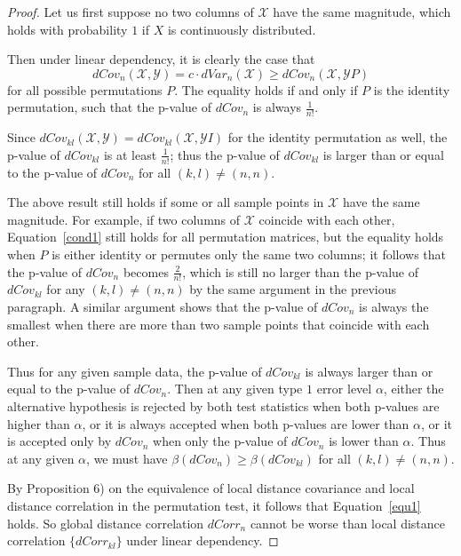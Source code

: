 \documentclass[12pt]{article}
\begin{document}
\begin{proof}
Let us first suppose no two columns of $\mathcal{X}$ have the same magnitude, which holds with probability $1$ if $X$ is continuously distributed. 

Then under linear dependency, it is clearly the case that 
\begin{equation}
\label{cond1}
dCov_{n}(\mathcal{X}, \mathcal{Y}) = c \cdot dVar_{n}(\mathcal{X}) \geq dCov_{n}(\mathcal{X}, \mathcal{Y}P)
\end{equation}
for all possible permutations $P$. The equality holds if and only if $P$ is the identity permutation, such that the p-value of $dCov_{n}$ is always $\frac{1}{n!}$. 

Since $dCov_{kl}(\mathcal{X}, \mathcal{Y})=dCov_{kl}(\mathcal{X}, \mathcal{Y}I)$ for the identity permutation as well, the p-value of $dCov_{kl}$ is at least $\frac{1}{n!}$; thus the p-value of $dCov_{kl}$ is larger than or equal to the p-value of $dCov_{n}$ for all $(k,l) \neq (n,n)$. 

The above result still holds if some or all sample points in $\mathcal{X}$ have the same magnitude. For example, if two columns of $\mathcal{X}$ coincide with each other, Equation~\ref{cond1} still holds for all permutation matrices, but the equality holds when $P$ is either identity or permutes only the same two columns; it follows that the p-value of $dCov_{n}$ becomes $\frac{2}{n!}$, which is still no larger than the p-value of $dCov_{kl}$ for any $(k,l) \neq (n,n)$ by the same argument in the previous paragraph. A similar argument shows that the p-value of $dCov_{n}$ is always the smallest when there are more than two sample points that coincide with each other.

Thus for any given sample data, the p-value of $dCov_{kl}$ is always larger than or equal to the p-value of $dCov_{n}$. Then at any given type $1$ error level $\alpha$, either the alternative hypothesis is rejected by both test statistics when both p-values are higher than $\alpha$, or it is always accepted when both p-values are lower than $\alpha$, or it is accepted only by $dCov_{n}$ when only the p-value of $dCov_{n}$ is lower than $\alpha$. Thus at any given $\alpha$, we must have $\beta(dCov_{n}) \geq \beta(dCov_{kl})$ for all $(k,l) \neq (n,n)$.

By Proposition 6) on the equivalence of local distance covariance and local distance correlation in the permutation test, it follows that Equation~\ref{equ1} holds. So global distance correlation $dCorr_{n}$ cannot be worse than local distance correlation $\{dCorr_{kl}\}$ under linear dependency.
\end{proof}
\end{document}
